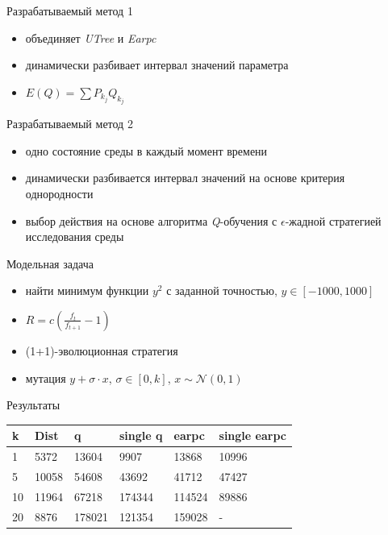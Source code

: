 \documentclass[hyperref=unicode,graphics=pdflatex,13pt]{beamer}
\begin{document}
\begin{frame}{Разрабатываемый метод 1}
    \begin{itemize}
        \item объединяет \textit{UTree} и \textit{Earpc}
        \item динамически разбивает интервал значений параметра
        \item $E(Q) = \sum{P_{k_j}Q_{k_j}}$
    \end{itemize}
\end{frame}

\begin{frame}{Разрабатываемый метод 2}
  \begin{itemize}
   \item одно состояние среды в каждый момент времени
   \item динамически разбивается интервал значений на основе критерия однородности
   \item выбор действия на основе алгоритма \textit{Q}-обучения с $\epsilon$-жадной стратегией исследования среды
  \end{itemize}
\end{frame}

\begin{frame}{Модельная задача}
    \begin{itemize}
        \item найти минимум функции $y^2$ с заданной точностью, $y \in [-1000, 1000]$
        \item $R = c(\frac{f_t}{f_{t + 1}} - 1)$
        \item (1+1)-эволюционная стратегия
        \item мутация $y + \sigma \cdot x$, $\sigma \in [0, k]$, $x \sim \mathcal{N}(0,1)$
    \end{itemize}
\end{frame}

\begin{frame}{Результаты}
    \begin{center}
        \begin{tabular}{|l|l|l|l|l|l|}
            \hline
            k & Dist & q & single q & earpc & single earpc\\
            \hline
            1 & \cellcolor{olivegreen}5372 & 13604 & 9907 & 13868 & 10996 \\
            \hline
            5 & \cellcolor{olivegreen}10058 & 54608 & 43692 & 41712 & 47427 \\
            \hline
            10 & \cellcolor{olivegreen}11964 & 67218 & 174344 & 114524 & 89886 \\
            \hline
            20 & \cellcolor{olivegreen}8876 & 178021 & 121354 & 159028 & - \\
            \hline
        \end{tabular}
    \end{center}
\end{frame}
\end{document}

